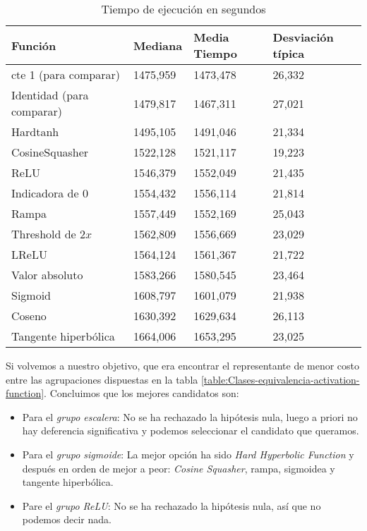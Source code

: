 \begin{table}[H]
    \centering
    \begin{tabular}{|l|l|l|l|}
    \hline
        Función & Mediana & Media Tiempo & Desviación típica \\ \hline
        cte 1 (para comparar) & 1475,959 & 1473,478 & 26,332 \\ \hline
        Identidad (para comparar) & 1479,817 & 1467,311 & 27,021 \\ \hline
        Hardtanh & 1495,105 & 1491,046 & 21,334 \\ \hline
        CosineSquasher & 1522,128 & 1521,117 & 19,223 \\ \hline
        ReLU & 1546,379 & 1552,049 & 21,435 \\ \hline
        Indicadora de 0 & 1554,432 & 1556,114 & 21,814 \\ \hline
        Rampa & 1557,449 & 1552,169 & 25,043 \\ \hline
        Threshold de $2x$ & 1562,809 & 1556,669 & 23,029 \\ \hline
        LReLU & 1564,124 & 1561,367 & 21,722 \\ \hline
        Valor absoluto & 1583,266 & 1580,545 & 23,464 \\ \hline
        Sigmoid & 1608,797 & 1601,079 & 21,938 \\ \hline
        Coseno & 1630,392 & 1629,634 & 26,113 \\ \hline
        Tangente hiperbólica & 1664,006 & 1653,295 & 23,025 \\ \hline
    \end{tabular}
    \caption{Tiempo de ejecución en segundos}
    \label{Tiempos-ejecucion-comparativas}
\end{table}


Si volvemos a nuestro objetivo, que era encontrar el representante de 
menor costo entre las agrupaciones dispuestas en la tabla \ref{table:Clases-equivalencia-activation-function}. Concluimos que los mejores candidatos son: 

\begin{itemize}
    \item Para el \textit{grupo escalera}: No se ha rechazado la hipótesis nula, luego a priori no hay deferencia significativa y podemos seleccionar el candidato que queramos. 
    \item Para el \textit{grupo sigmoide}: La mejor opción ha sido \textit{Hard Hyperbolic Function} y  después en orden de mejor a peor: \textit{Cosine Squasher}, rampa, sigmoidea y tangente hiperbólica.
    \item Pare el \textit{grupo ReLU}: No se ha rechazado la hipótesis nula, así que no podemos decir nada. 
\end{itemize}

